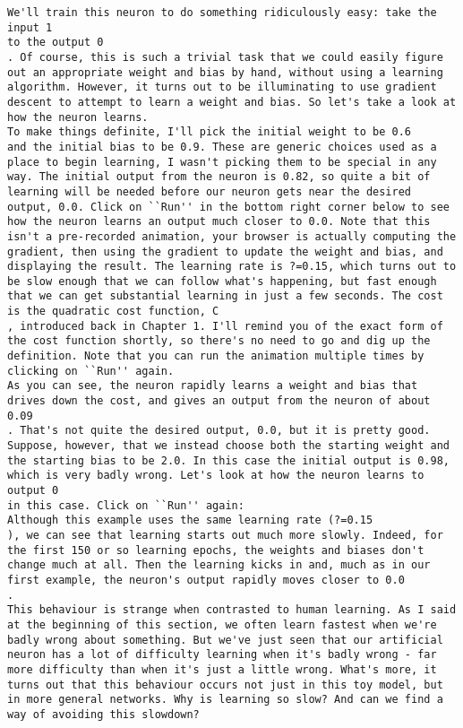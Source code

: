 \begin{lstlisting}
We'll train this neuron to do something ridiculously easy: take the input 1
to the output 0
. Of course, this is such a trivial task that we could easily figure out an appropriate weight and bias by hand, without using a learning algorithm. However, it turns out to be illuminating to use gradient descent to attempt to learn a weight and bias. So let's take a look at how the neuron learns.
To make things definite, I'll pick the initial weight to be 0.6
and the initial bias to be 0.9. These are generic choices used as a place to begin learning, I wasn't picking them to be special in any way. The initial output from the neuron is 0.82, so quite a bit of learning will be needed before our neuron gets near the desired output, 0.0. Click on ``Run'' in the bottom right corner below to see how the neuron learns an output much closer to 0.0. Note that this isn't a pre-recorded animation, your browser is actually computing the gradient, then using the gradient to update the weight and bias, and displaying the result. The learning rate is ?=0.15, which turns out to be slow enough that we can follow what's happening, but fast enough that we can get substantial learning in just a few seconds. The cost is the quadratic cost function, C
, introduced back in Chapter 1. I'll remind you of the exact form of the cost function shortly, so there's no need to go and dig up the definition. Note that you can run the animation multiple times by clicking on ``Run'' again.
As you can see, the neuron rapidly learns a weight and bias that drives down the cost, and gives an output from the neuron of about 0.09
. That's not quite the desired output, 0.0, but it is pretty good. Suppose, however, that we instead choose both the starting weight and the starting bias to be 2.0. In this case the initial output is 0.98, which is very badly wrong. Let's look at how the neuron learns to output 0
in this case. Click on ``Run'' again:
Although this example uses the same learning rate (?=0.15
), we can see that learning starts out much more slowly. Indeed, for the first 150 or so learning epochs, the weights and biases don't change much at all. Then the learning kicks in and, much as in our first example, the neuron's output rapidly moves closer to 0.0
.
This behaviour is strange when contrasted to human learning. As I said at the beginning of this section, we often learn fastest when we're badly wrong about something. But we've just seen that our artificial neuron has a lot of difficulty learning when it's badly wrong - far more difficulty than when it's just a little wrong. What's more, it turns out that this behaviour occurs not just in this toy model, but in more general networks. Why is learning so slow? And can we find a way of avoiding this slowdown?

\end{lstlisting}
